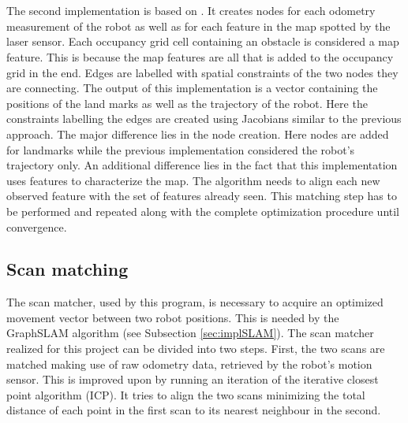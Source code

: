 \documentclass{ba-kecs}
\begin{document}
\\
\\
The second implementation is based on \cite{Thrun}. It creates nodes for each odometry measurement of the robot as well as for each feature in the map spotted by the laser sensor. Each occupancy grid cell containing an obstacle is considered a map feature. This is because the map features are all that is added to the occupancy grid in the end. Edges are labelled with spatial constraints of the two nodes they are connecting. The output of this implementation is a vector containing the positions of the land marks as well as the trajectory of the robot. Here the constraints labelling the edges are created using Jacobians similar to the previous approach. The major difference lies in the node creation. Here nodes are added for landmarks while the previous implementation considered the robot's trajectory only. An additional difference lies in the fact that this implementation uses features to characterize the map. The algorithm needs to align each new observed feature with the set of features already seen. This matching step has to be performed and repeated along with the complete optimization procedure until convergence.

\subsection{Scan matching}
\label{sec:scan}
The scan matcher, used by this program, is necessary to acquire an optimized movement vector between two robot positions. This is needed by the GraphSLAM algorithm (see Subsection \ref{sec:implSLAM}). The scan matcher realized for this project can be divided into two steps. First, the two scans are matched making use of raw odometry data, retrieved by the robot's motion sensor. This is improved upon by running an iteration of the iterative closest point algorithm (ICP). It tries to align the two scans minimizing the total distance of each point in the first scan to its nearest neighbour in the second. 
\end{document}
